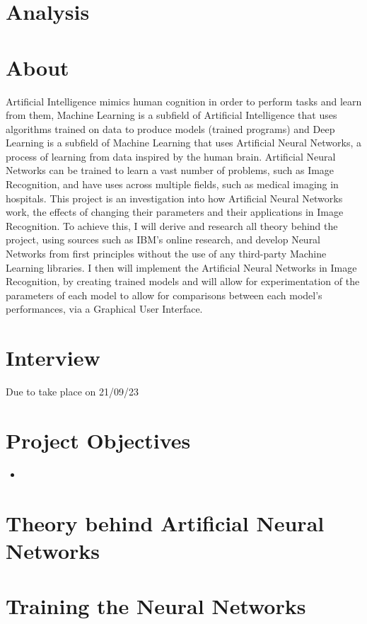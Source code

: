 \documentclass[10pt,a4paper]{article}
\begin{document}
\maketitle

\section{Analysis}

\section*{About}

Artificial Intelligence mimics human cognition in order to perform tasks and learn from them, Machine Learning is a subfield of Artificial Intelligence that uses 
algorithms trained on data to produce models (trained programs) and Deep Learning is a subfield of Machine Learning that uses Artificial Neural Networks, a process of 
learning from data inspired by the human brain. Artificial Neural Networks can be trained to learn a vast number of problems, such as Image Recognition, and have uses 
across multiple fields, such as medical imaging in hospitals. This project is an investigation into how Artificial Neural Networks work, the effects of changing their 
parameters and their applications in Image Recognition. To achieve this, I will derive and research all theory behind the project, using sources such as IBM's online 
research, and develop Neural Networks from first principles without the use of any third-party Machine Learning libraries. I then will implement the Artificial Neural 
Networks in Image Recognition, by creating trained models and will allow for experimentation of the parameters of each model to allow for comparisons between each 
model's performances, via a Graphical User Interface.

\section*{Interview}

Due to take place on 21/09/23

\section*{Project Objectives}

\begin{itemize}
    \item 
\end{itemize}

\section*{Theory behind Artificial Neural Networks}

\section*{Training the Neural Networks}
\end{document}
